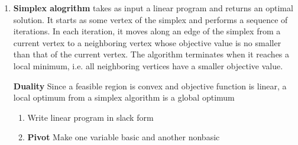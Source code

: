 \documentclass[11pt]{article}
\begin{document}
\begin{defn*}
\begin{enumerate}
        \item \textbf{Simplex alogrithm} takes as input a linear program and returns an optimal solution. It starts as some vertex of the simplex and performs a sequence of iterations. In each iteration, it moves along an edge of the simplex from a current vertex to a neighboring vertex whose objective value is no smaller than that of the current vertex. The algorithm terminates when it reaches a local minimum, i.e. all neighboring vertices have a smaller objective value. 
        \begin{lemma*}
            \textbf{Duality} Since a feasible region is convex and objective function is linear, a local optimum from a simplex algorithm is a global optimum
        \end{lemma*}
        \begin{enumerate}
            \item Write linear program in slack form
            \item \textbf{Pivot} Make one variable basic and another nonbasic
        \end{enumerate}
    \end{enumerate}
\end{defn*}
\end{document}
